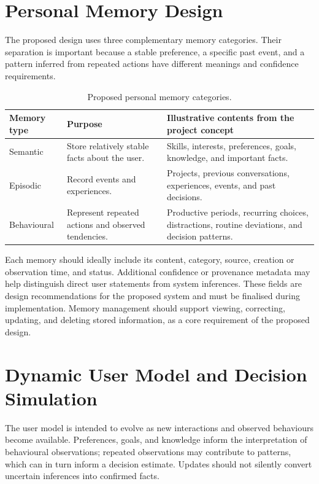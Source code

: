 \documentclass{tietreport}
\begin{document}
\section{Personal Memory Design}
The proposed design uses three complementary memory categories. Their separation is important because a stable preference, a specific past event, and a pattern inferred from repeated actions have different meanings and confidence requirements.
\begin{table}[htbp]
\centering
\small
\begin{tabular}{p{28mm}p{53mm}p{55mm}}
\toprule
\textbf{Memory type} & \textbf{Purpose} & \textbf{Illustrative contents from the project concept} \\
\midrule
Semantic & Store relatively stable facts about the user. & Skills, interests, preferences, goals, knowledge, and important facts. \\
Episodic & Record events and experiences. & Projects, previous conversations, experiences, events, and past decisions. \\
Behavioural & Represent repeated actions and observed tendencies. & Productive periods, recurring choices, distractions, routine deviations, and decision patterns. \\
\bottomrule
\end{tabular}
\caption{Proposed personal memory categories.}
\label{tab:memory}
\end{table}

Each memory should ideally include its content, category, source, creation or observation time, and status. Additional confidence or provenance metadata may help distinguish direct user statements from system inferences. These fields are design recommendations for the proposed system and must be finalised during implementation. Memory management should support viewing, correcting, updating, and deleting stored information, as a core requirement of the proposed design.

\clearpage
\section{Dynamic User Model and Decision Simulation}
The user model is intended to evolve as new interactions and observed behaviours become available. Preferences, goals, and knowledge inform the interpretation of behavioural observations; repeated observations may contribute to patterns, which can in turn inform a decision estimate. Updates should not silently convert uncertain inferences into confirmed facts.
\end{document}
